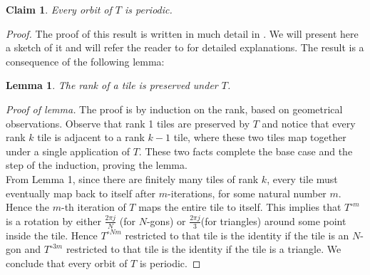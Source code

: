 \documentclass[11pt, oneside]{article}   	%
\newtheorem{lemma}{Lemma}
\newtheorem{claim}{Claim}
\begin{document}
\begin{claim}
Every orbit of $T$ is periodic.
\end{claim}
\begin{proof}
The proof of this  result is written in much detail in \cite{dogtab}. We will present here a sketch of it and will refer the reader to \cite{dogtab} for detailed explanations.
The result is a consequence of the following lemma:
\begin{lemma} The rank of a tile is preserved under $T$.
\end{lemma}
\textit{Proof of lemma.} The proof is  by  induction  on the rank, based on geometrical observations. Observe that rank 1 tiles are preserved by $T$ and notice that every rank $k$ tile is adjacent to a rank $k-1$ tile, where these two tiles map together under a single application of $T$. These two facts complete the base case and the step of the induction, proving the lemma.
\\

From Lemma 1, since there are finitely many tiles of rank $k$, every tile must eventually map back to itself after $m$-iterations, for some natural number $m$. Hence the $m$-th iteration of $T$ maps the entire  tile to itself. This  implies that $T^{\circ m}$ is a rotation by either $\frac{2\pi j}{N}$ (for $N$-gons) or $\frac{2\pi j}{3}$(for triangles) around some point inside the tile. Hence $T^{\circ Nm}$ restricted to that tile is the identity if the tile is an $N$-gon and $T^{\circ 3m}$ restricted to that tile is the identity if the tile is a triangle. We conclude that every orbit of $T$ is periodic.
\end{proof}    
\end{document}
